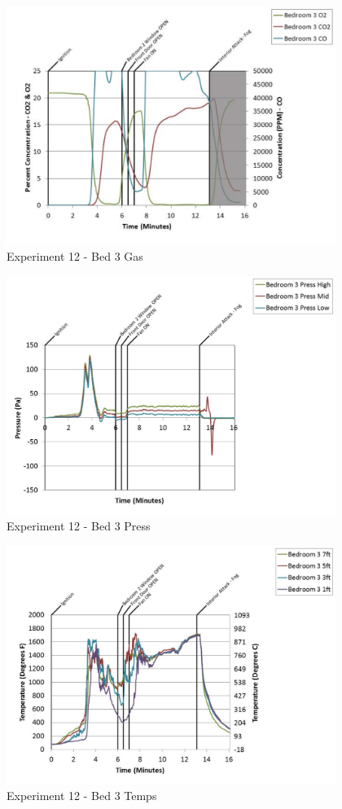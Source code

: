 \documentclass{article}
\begin{document}
\begin{appendices}
	\clearpage

	\begin{figure}[h!]
		\centering
		\includegraphics[height=3.05in]{0_Images/Results_Charts/Exp_12_Charts/Bed3Gas.pdf}
		\caption{Experiment 12 - Bed 3 Gas}
	\end{figure}
 

	\begin{figure}[h!]
		\centering
		\includegraphics[height=3.05in]{0_Images/Results_Charts/Exp_12_Charts/Bed3Press.pdf}
		\caption{Experiment 12 - Bed 3 Press}
	\end{figure}
 
	\clearpage

	\begin{figure}[h!]
		\centering
		\includegraphics[height=3.05in]{0_Images/Results_Charts/Exp_12_Charts/Bed3Temps.pdf}
		\caption{Experiment 12 - Bed 3 Temps}
	\end{figure}
 


\end{appendices}
\end{document}
